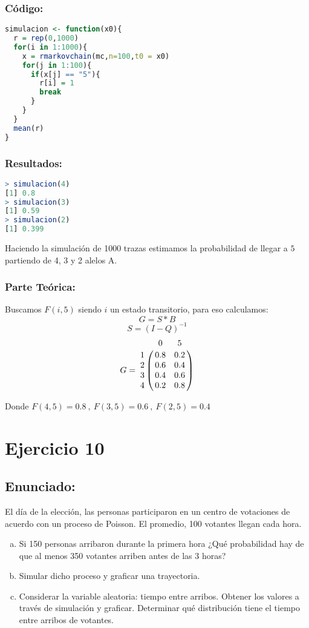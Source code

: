 \documentclass{article}
\begin{document}
\begin{enumerate}[(a)]
 \subsubsection*{Código:}
\begin{lstlisting}[language=R]
simulacion <- function(x0){
  r = rep(0,1000)
  for(i in 1:1000){
    x = rmarkovchain(mc,n=100,t0 = x0)
    for(j in 1:100){
      if(x[j] == "5"){
        r[i] = 1
        break  
      } 
    }
  }
  mean(r)
}
\end{lstlisting}

\subsubsection*{Resultados:}
\begin{lstlisting}[language=R]
> simulacion(4)
[1] 0.8
> simulacion(3)
[1] 0.59
> simulacion(2)
[1] 0.399
\end{lstlisting}

Haciendo la simulación de 1000 trazas estimamos la probabilidad de llegar a $5$ partiendo de 4, 3 y 2 alelos A.

\pagebreak
 \subsubsection*{Parte Teórica:}
 Buscamos $F(i,5)$ siendo $i$ un estado transitorio, para eso calculamos: $$G = S * B$$ $$S = (I - Q)^{-1}$$
 $$
G = 
\bordermatrix{ 
\text{} & 0 & 5 \cr
 1  &0.8  &0.2 \cr
 2  &0.6  &0.4 \cr
 3  &0.4  &0.6 \cr
 4 & 0.2  &0.8 
}
$$

Donde $F(4,5) = 0.8\:,\:F(3,5) = 0.6\:,\:F(2,5) = 0.4 $

\end{enumerate}

\section*{Ejercicio 10}
\subsection*{Enunciado:}
El día de la elección, las personas participaron en un centro de votaciones de acuerdo con un proceso de Poisson. El promedio, 100 votantes llegan cada hora.
\begin{enumerate}[(a)] 

\item Si 150 personas arribaron durante la primera hora ¿Qué probabilidad hay de que al menos 350 votantes arriben antes de las 3 horas?
\item Simular dicho proceso y graficar una trayectoria.
\item Considerar la variable aleatoria: tiempo entre arribos. Obtener los valores a través de simulación y graficar. Determinar qué distribución tiene el tiempo entre arribos de votantes.
\end{enumerate}
\end{document}
